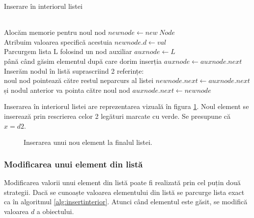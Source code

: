 \begin{algorithm}[H]
	\caption{Inserare în interiorul listei}\label{alg:insertinterior}
	\begin{algorithmic}[1]
		 \\		
		\Comment Alocăm memorie pentru noul nod \hfill \tab{}\tab{}\tab{}
		\State $newnode \gets new \hspace{3pt} Node$\\
		\Comment Atribuim valoarea specifică acestuia \hfill \tab{}\tab{}\tab{}
		\State $newnode.d \gets val$\\
		\Comment Parcurgem lista L folosind un nod auxiliar  \hfill \tab{}\tab{}
		\State $auxnode \gets L$\\
		\Comment până când găsim elementul după care dorim inserția  \hfill \tab{}
		\While {$auxnode.d \neq  x$}
		\State $auxnode \gets auxnode.next$
		\EndWhile 	\\
		\Comment Inserăm nodul în listă suprascriind 2 referințe: \hfill \tab{} \tab{} \\
		\Comment noul nod pointează către restul neparcurs al listei\hfill \tab{} 
		\State $newnode.next \gets auxnode.next$\\
		\Comment și nodul anterior va pointa către noul nod\hfill  \tab{} \tab{}
		\State $auxnode.next \gets newnode$
		\EndProcedure
	\end{algorithmic}
\end{algorithm}

Inserarea în interiorul listei are reprezentarea vizuală în figura \ref{fig:insertinterior}. Noul element se inserează prin rescrierea celor 2 legături marcate cu verde. Se presupune că $x=d2$.

\begin{figure}[H] 
	\centering	
	{
	}
	\caption{Inserarea unui nou element la finalul listei.} 
	\label{fig:insertinterior}
\end{figure}

\subsubsection{Modificarea unui element din listă}

Modificarea valorii unui element din listă poate fi realizată prin cel puțin două strategii. Dacă se cunoaște valoarea elementului din listă se parcurge lista exact ca în algoritmul \ref{alg:insertinterior}. Atunci când elementul este găsit, se modifică valoarea $d$ a obiectului.

